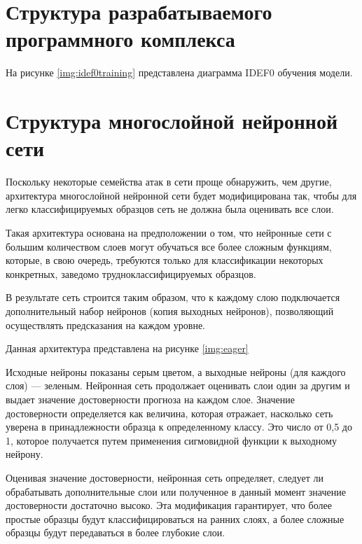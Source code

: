 \section{Структура разрабатываемого программного комплекса}



На рисунке \ref*{img:idef0training} представлена диаграмма IDEF0 обучения модели.


\section{Структура многослойной нейронной сети}

Поскольку некоторые семейства атак в сети проще обнаружить, 
чем другие, архитектура многослойной нейронной сети будет модифицирована так, 
чтобы для легко классифицируемых образцов сеть не должна была оценивать все слои.

Такая архитектура основана на
предположении о том, что нейронные сети с большим количеством слоев могут
обучаться все более сложным функциям, которые, в свою очередь, 
требуются только для классификации некоторых конкретных, заведомо
трудноклассифицируемых образцов.

В результате сеть строится таким
образом, что к каждому слою подключается дополнительный набор нейронов
(копия выходных нейронов), позволяющий осуществлять предсказания на каждом уровне.

Данная архитектура представлена на рисунке \ref*{img:eager}


Исходные нейроны показаны серым цветом, а выходные нейроны (для каждого слоя) --- зеленым. 
Нейронная сеть продолжает оценивать слои один за другим и выдает значение достоверности прогноза на каждом слое.
Значение достоверности определяется как величина, которая отражает, насколько
сеть уверена в принадлежности образца  к определенному классу. Это число от 0,5 до 1, которое
получается путем применения сигмовидной функции к выходному нейрону.

Оценивая значение достоверности, нейронная сеть определяет, следует ли обрабатывать дополнительные 
слои или полученное в данный момент значение достоверности достаточно высоко. Эта модификация гарантирует, 
что более простые образцы будут классифицироваться на ранних слоях, 
а более сложные образцы будут передаваться в более глубокие слои.


